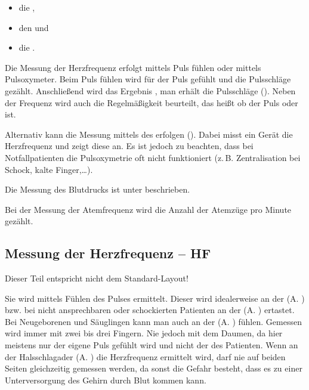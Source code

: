 \begin{itemize}
\item die , 
\item den  und 
\item die .
\end{itemize}

Die Messung der Herzfrequenz erfolgt mittels Puls fühlen oder
mittels Pulsoxymeter. Beim Puls fühlen wird für
 der Puls gefühlt und die Pulsschläge
gezählt. Anschließend wird das Ergebnis , man erhält die Pulsschläge 
(). Neben der Frequenz wird auch die
Regelmäßigkeit beurteilt, das heißt ob der Puls  oder  ist.

Alternativ kann die Messung mittels des 
erfolgen (). Dabei misst ein
Gerät die Herzfrequenz und zeigt diese an. Es ist jedoch zu
beachten, dass bei Notfallpatienten die Pulsoxymetrie oft
nicht funktioniert (z.\,B. Zentralisation bei Schock, kalte Finger,\ldots).

Die Messung des Blutdrucks ist unter  beschrieben.

Bei der Messung der Atemfrequenz wird die Anzahl der Atemzüge pro Minute gezählt.







\subsection{Messung der Herzfrequenz -- HF}
\label{topic:pulsmessung}
{Dieser Teil entspricht nicht dem Standard-Layout!}

 

Sie wird mittels Fühlen des Pulses
ermittelt.  
Dieser wird idealerweise an der
 (A. ) bzw. bei nicht
ansprechbaren oder schockierten Patienten an der
 (A. ) ertastet. Bei
Neugeborenen und Säuglingen kann man auch an der
 (A. ) fühlen. Gemessen
wird immer mit zwei bis drei Fingern. Nie jedoch mit dem Daumen, da hier meistens nur der eigene Puls gefühlt wird und nicht der des
Patienten. Wenn an der Halsschlagader (A. ) die
Herzfrequenz ermittelt wird, darf nie auf beiden Seiten
gleichzeitig gemessen werden, da sonst die Gefahr besteht,
dass es zu einer Unterversorgung des Gehirn durch Blut kommen
kann.

